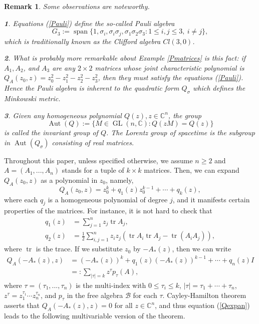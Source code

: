 \documentclass[draft, 12pt, reqno]{amsart}
\newcommand{\C}{{\mathbb C}}
\newcommand{\B}{{\mathcal B}}
\numberwithin{equation}{section}
\DeclareMathOperator{\aut}{Aut}
\DeclareMathOperator{\tr}{tr}
\DeclareMathOperator{\SP}{span}
\DeclareMathOperator{\GL}{GL}
\theoremstyle{plain}
\newtheorem{remark}[theorem]{Remark}
\begin{document}
\begin{remark} \normalfont Some observations are noteworthy.

{\bf 1}. Equations (\ref{Pauli}) define the so-called Pauli algebra 
\[G_3:=\SP\{1, \sigma_i, \sigma_i\sigma_j, \sigma_1\sigma_2\sigma_3: 1\leq i, j\leq 3,\ i\neq j\},\]
which is traditionally known as the Clifford algebra $Cl(3,0)$. 

{\bf 2}. What is probably more remarkable about Example \ref{Pmatrices} is this fact: if $A_1, A_2$, and $A_3$ are any $2\times 2$ matrices whose joint characteristic polynomial is $Q_A(z_0,z)=z_0^2-z_1^2-z_2^2-z_3^2$, then they must satisfy the equations (\ref{Pauli}). Hence the Pauli algebra is inherent to the quadratic form $Q_\sigma$ which defines the Minkowski metric. 

{\bf 3}. Given any homogeneous polynomial $Q(z), z\in \C^n$, the group \[\aut (Q):=\{M\in \GL(n,\C): Q(zM)=Q(z)\}\] is called the {\em invariant group} of $Q$. The Lorentz group of spacetime is the subgroup in $\aut (Q_\sigma)$ consisting of real matrices.
\end{remark}

Throughout this paper, unless specified otherwise, we assume $n\geq 2$ and $A=(A_1, ..., A_n)$ stands for a tuple of $k\times k$ matrices. Then, we can expand $Q_A(z_0, z)$ as a polynomial in $z_0$, namely, 
\begin{equation}\label{expandQ}
    Q_A(z_0, z)=z_0^k+q_1(z)z_0^{k-1}+\cdots + q_k(z),
    \end{equation}
    where each $q_j$ is a homogeneous polynomial of degree $j$, and it manifests certain properties of the matrices. For instance, it is not hard to check \cite{Ya24} that
\begin{align}
 q_1(z)&=\sum_{j=1}^n z_j\tr A_j,\\
 q_2(z)&=\frac{1}{2}\sum_{i,j=1}^n z_iz_j\left(\tr A_i \tr A_j-\tr (A_iA_j)\right),
\end{align}where $\tr$ is the trace. If we substitute $z_0$ by $-A_*(z)$, then we can write 
\begin{align}
Q_A(-A_*(z), z)&=(-A_*(z))^k+q_1(z)(-A_*(z))^{k-1}+\cdots + q_n(z)I \nonumber \\
&=:\sum_{|\tau|=k}z^{\tau}p_\tau(A),\label{Qexpan}
\end{align} where $\tau=(\tau_1, ..., \tau_n)$ is the multi-index with $0\leq \tau_i\leq k$, $|\tau|=\tau_1+\cdots +\tau_n$,  $z^\tau=z_1^{\tau_1}\cdots z_n^{\tau_n}$, and $p_\tau$ in the free algebra $\B$ for each $\tau$. Cayley-Hamilton theorem asserts that $Q_A(-A_*(z), z)=0$ for all $z\in \C^{n}$, and thus equation (\ref{Qexpan}) leads to the following multivariable version of the theorem.
\end{document}
